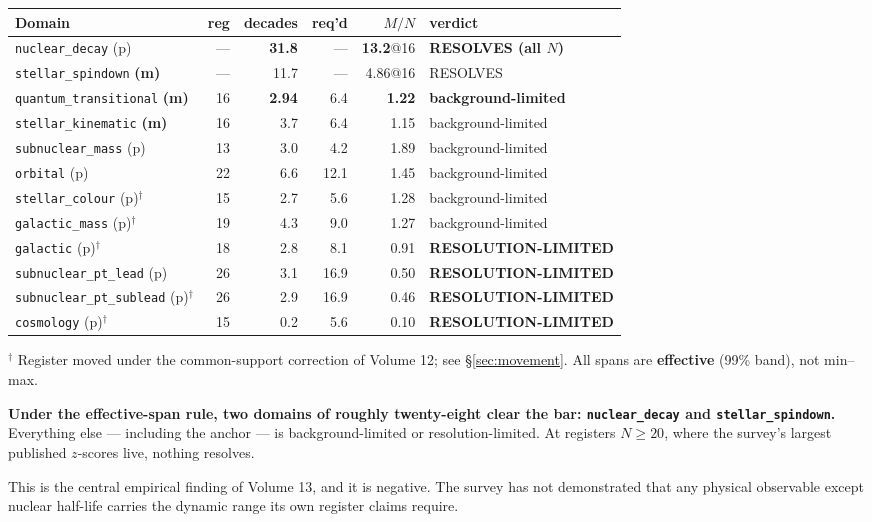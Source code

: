 \documentclass[11pt, letterpaper, openany]{book}
\newcommand{\MN}{M/N}
\begin{document}
\begin{table}[H]
\centering
\footnotesize
\begin{tabular}{@{}lrrrrl@{}}
\toprule
\textbf{Domain} & \textbf{reg} & \textbf{decades} & \textbf{req'd} & \textbf{$\MN$} & \textbf{verdict} \\
\midrule
\texttt{nuclear\_decay} (p) & --- & \textbf{31.8} & --- & \textbf{13.2}@16 & \textbf{RESOLVES (all $N$)} \\
\texttt{stellar\_spindown} \textbf{(m)} & --- & 11.7 & --- & 4.86@16 & RESOLVES \\
\texttt{quantum\_transitional} \textbf{(m)} & 16 & \textbf{2.94} & 6.4 & \textbf{1.22} & \textbf{background-limited} \\
\texttt{stellar\_kinematic} \textbf{(m)} & 16 & 3.7 & 6.4 & 1.15 & background-limited \\
\midrule
\texttt{subnuclear\_mass} (p) & 13 & 3.0 & 4.2 & 1.89 & background-limited \\
\texttt{orbital} (p) & 22 & 6.6 & 12.1 & 1.45 & background-limited \\
\texttt{stellar\_colour} (p)$^\dagger$ & 15 & 2.7 & 5.6 & 1.28 & background-limited \\
\texttt{galactic\_mass} (p)$^\dagger$ & 19 & 4.3 & 9.0 & 1.27 & background-limited \\
\midrule
\texttt{galactic} (p)$^\dagger$ & 18 & 2.8 & 8.1 & 0.91 & \textbf{RESOLUTION-LIMITED} \\
\texttt{subnuclear\_pt\_lead} (p) & 26 & 3.1 & 16.9 & 0.50 & \textbf{RESOLUTION-LIMITED} \\
\texttt{subnuclear\_pt\_sublead} (p)$^\dagger$ & 26 & 2.9 & 16.9 & 0.46 & \textbf{RESOLUTION-LIMITED} \\
\texttt{cosmology} (p)$^\dagger$ & 15 & 0.2 & 5.6 & 0.10 & \textbf{RESOLUTION-LIMITED} \\
\bottomrule
\end{tabular}
\end{table}

\noindent\footnotesize
$^\dagger$ Register moved under the common-support correction of Volume 12; see \S\ref{sec:movement}.
All spans are \textbf{effective} (99\% band), not min--max. \normalsize

\begin{signalbox}
\textbf{Under the effective-span rule, two domains of roughly twenty-eight clear the bar:
\texttt{nuclear\_decay} and \texttt{stellar\_spindown}.} Everything else --- including the anchor
--- is background-limited or resolution-limited. At registers $N \geq 20$, where the survey's
largest published $z$-scores live, nothing resolves.

\medskip
This is the central empirical finding of Volume 13, and it is negative. The survey has not
demonstrated that any physical observable except nuclear half-life carries the dynamic range its
own register claims require.
\end{signalbox}
\end{document}

